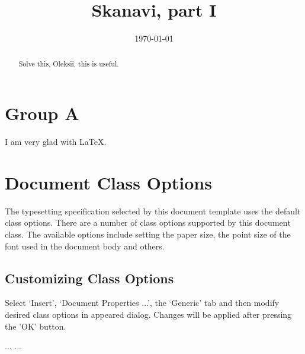 \documentclass{article}
\begin{document}
\title{Skanavi, part I}  
\date{\today}
\maketitle

\begin{abstract}
    Solve this, Oleksii, this is useful. 
\end{abstract}

\section{Group A}

\begin{enumerate}
\item {$\frac{\frac{1}{a}-\frac{1}{b+c}}{\frac{1}{a} + \frac{1}{b+c}}(1+\frac{b^{2}+a^{2}}a^{2}}{2bc}ac{a-bac{a-b-c}{abc}$;
 
$\frac{\frac{1}{a}-\frac{1}{b+c}}{\frac{1}{a} + \frac{1}{b+c}}=\frac{\frac{b+c-a}{a(b+c)}}{\frac{b+c+a}{a(b+c)}}=\frac{b+c-a}{b+c+a}$

$1+\frac{b^{2}+c^{2}-a^{2}}{2bc}=\frac{2bc+b^{2}+c^{2}-a^2}{2bc}=\frac{(b+c)^{2}-a^2}{2bc}$

$\frac{b+c-a}{b+c+a}*\frac{(b+c)^{2}-a^2}{2bc}*\frac{abc}{a-b-c}=\frac{b+c-a}{b+c+a}*\frac{(b+c+a)*(b+c-a)}{2bc}*\frac{abc}{a-b-c}=$

\item dddddd

\end{enumerate}

I am very glad with LaTeX{}.

\section{Document Class Options}
The typesetting specification selected by this document template
uses the default class options. There are a number of class options 
supported by this document class. The available options include 
setting the paper size, the point size of the font used in the 
document body and others.

\subsection{Customizing Class Options}
Select `Insert', `Document Properties ...', the `Generic' tab
and then modify desired class options in appeared dialog.
Changes will be applied after pressing the 'OK' button.

\begin{thebibliography}{99}
 ...
 ...
\end{thebibliography}
\end{document}
